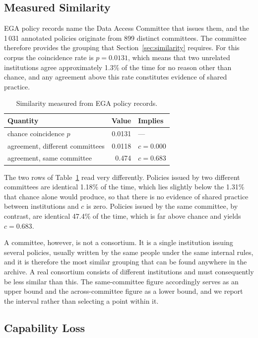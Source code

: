 \documentclass[sigconf,anonymous,review]{acmart}
\begin{document}
\subsection{Measured Similarity}
\label{sec:measured}

EGA policy records name the Data Access Committee that issues them, and the
1\,031 annotated policies originate from 899 distinct committees. The committee
therefore provides the grouping that Section~\ref{sec:similarity} requires. For
this corpus the coincidence rate is $p = 0.0131$, which means that two unrelated
institutions agree approximately 1.3\% of the time for no reason other than
chance, and any agreement above this rate constitutes evidence of shared
practice.

\begin{table}[h]
\caption{Similarity measured from EGA policy records.}
\label{tab:cohesion}
\begin{tabular}{lrl}
\toprule
Quantity & Value & Implies \\
\midrule
chance coincidence $p$ & 0.0131 & --- \\
agreement, different committees & 0.0118 & $c=0.000$ \\
agreement, same committee & 0.474 & $c=0.683$ \\
\bottomrule
\end{tabular}
\end{table}

The two rows of Table~\ref{tab:cohesion} read very differently. Policies issued
by two different committees are identical 1.18\% of the time, which lies slightly
below the 1.31\% that chance alone would produce, so that there is no evidence of
shared practice between institutions and $c$ is zero. Policies issued by the same
committee, by contrast, are identical 47.4\% of the time, which is far above
chance and yields $c = 0.683$.

A committee, however, is not a consortium. It is a single institution issuing
several policies, usually written by the same people under the same internal
rules, and it is therefore the most similar grouping that can be found anywhere
in the archive. A real consortium consists of different institutions and must
consequently be less similar than this. The same-committee figure accordingly
serves as an upper bound and the across-committee figure as a lower bound, and we
report the interval rather than selecting a point within it.

\subsection{Capability Loss}
\end{document}
